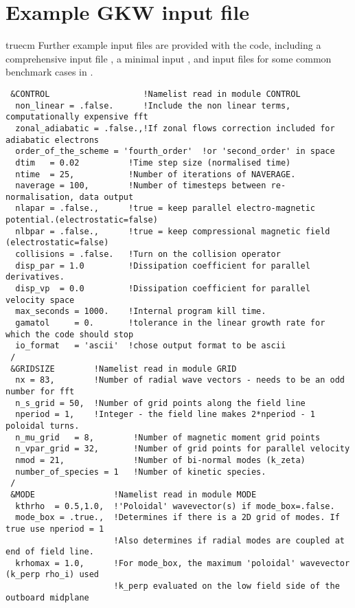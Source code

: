 \section{Example GKW input file}
 truecm
Further example input files are provided with the code, including a comprehensive input file 
, a minimal input , 
and input files for some common benchmark cases in .
\begin{scriptsize}
\begin{verbatim}
 &CONTROL                   !Namelist read in module CONTROL
  non_linear = .false.      !Include the non linear terms, computationally expensive fft
  zonal_adiabatic = .false.,!If zonal flows correction included for adiabatic electrons
  order_of_the_scheme = 'fourth_order'  !or 'second_order' in space
  dtim   = 0.02          !Time step size (normalised time)
  ntime  = 25,           !Number of iterations of NAVERAGE.
  naverage = 100,        !Number of timesteps between re-normalisation, data output
  nlapar = .false.,      !true = keep parallel electro-magnetic potential.(electrostatic=false)
  nlbpar = .false.,      !true = keep compressional magnetic field (electrostatic=false) 
  collisions = .false.   !Turn on the collision operator
  disp_par = 1.0         !Dissipation coefficient for parallel derivatives.
  disp_vp  = 0.0         !Dissipation coefficient for parallel velocity space
  max_seconds = 1000.    !Internal program kill time.
  gamatol     = 0.       !tolerance in the linear growth rate for which the code should stop
  io_format   = 'ascii'  !chose output format to be ascii
 /
 &GRIDSIZE        !Namelist read in module GRID
  nx = 83,        !Number of radial wave vectors - needs to be an odd number for fft
  n_s_grid = 50,  !Number of grid points along the field line 
  nperiod = 1,    !Integer - the field line makes 2*nperiod - 1 poloidal turns. 
  n_mu_grid   = 8,        !Number of magnetic moment grid points
  n_vpar_grid = 32,       !Number of grid points for parallel velocity 
  nmod = 21,              !Number of bi-normal modes (k_zeta)
  number_of_species = 1   !Number of kinetic species. 
 /
 &MODE                !Namelist read in module MODE
  kthrho  = 0.5,1.0,  !'Poloidal' wavevector(s) if mode_box=.false.
  mode_box = .true.,  !Determines if there is a 2D grid of modes. If true use nperiod = 1
                      !Also determines if radial modes are coupled at end of field line.
  krhomax = 1.0,      !For mode_box, the maximum 'poloidal' wavevector (k_perp rho_i) used
                      !k_perp evaluated on the low field side of the outboard midplane

\end{verbatim}
\end{scriptsize}
